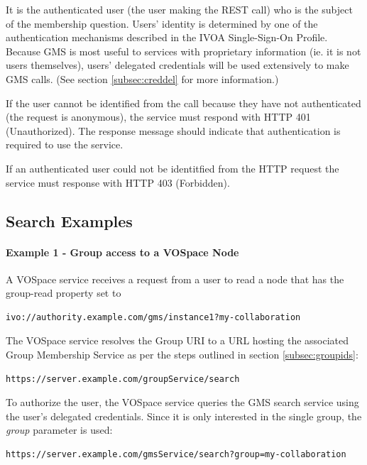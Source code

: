 \documentclass[11pt,a4paper]{ivoa}
\begin{document}
It is the authenticated user (the user making the REST call) who is the subject of the membership question.  Users' identity is determined by one of the authentication mechanisms described in the IVOA Single-Sign-On Profile.  Because GMS is most useful to services with proprietary information (ie. it is not users themselves), users' delegated credentials will be used extensively to make GMS calls.  (See section \ref{subsec:creddel} for more information.)

If the user cannot be identified from the call because they have not authenticated (the request is anonymous), the service must respond with HTTP 401 (Unauthorized).  The response message should indicate that authentication is required to use the service.

If an authenticated user could not be identitfied from the HTTP request the service must response with HTTP 403 (Forbidden).

\subsection {Search Examples}
\label{subsec:examples}

\paragraph{Example 1 - Group access to a VOSpace Node}

A VOSpace service receives a request from a user to read a node that has the group-read property set to

\begin{verbatim}
ivo://authority.example.com/gms/instance1?my-collaboration
\end{verbatim}

The VOSpace service resolves the Group URI to a URL hosting the associated Group Membership Service as per the steps outlined in section \ref{subsec:groupids}:

\begin{verbatim}
https://server.example.com/groupService/search
\end{verbatim}

To authorize the user, the VOSpace service queries the GMS search service using the user's delegated credentials.  Since it is only interested in the single group, the \emph{group} parameter is used:

\begin{verbatim}
https://server.example.com/gmsService/search?group=my-collaboration
\end{verbatim}
\end{document}
